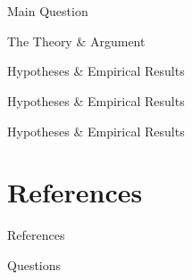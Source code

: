 \documentclass{Bredelebeamer}\usepackage[]{graphicx}\usepackage[]{color}
\begin{document}


\section{\cite{Bak2017}}
\begin{frame}{Main Question}

\end{frame}

\begin{frame}{The Theory \& Argument}

\end{frame}

\begin{frame}{Hypotheses \& Empirical Results}

\end{frame}

\begin{frame}{Hypotheses \& Empirical Results}

\end{frame}

\begin{frame}{Hypotheses \& Empirical Results}

\end{frame}

\section{References}
\begin{frame}{References}


\end{frame}


\begin{frame}{Questions}
	
\end{frame}
\end{document}
